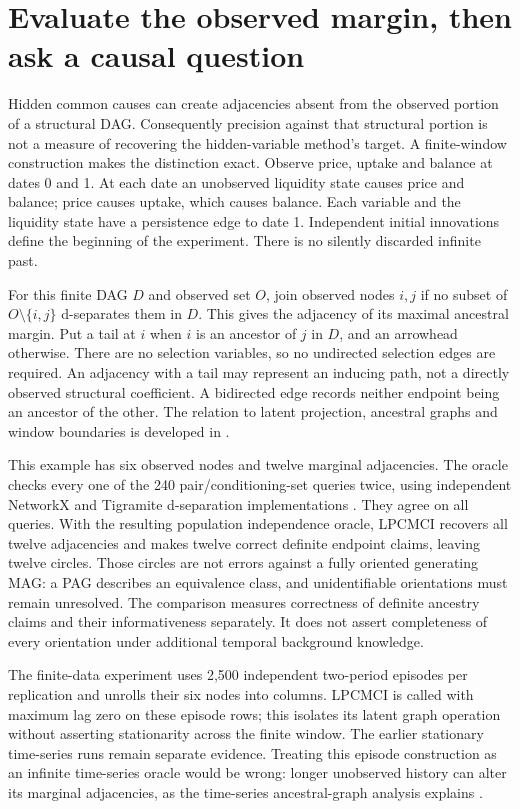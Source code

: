 \section{Evaluate the observed margin, then ask a causal question}
\label{s6:ancestral-target}
Hidden common causes can create adjacencies absent from the observed portion
of a structural DAG. Consequently precision against that structural portion
is not a measure of recovering the hidden-variable method's target. A
finite-window construction makes the distinction exact. Observe price,
uptake and balance at dates 0 and 1. At each date an unobserved liquidity
state causes price and balance; price causes uptake, which causes balance.
Each variable and the liquidity state have a persistence edge to date 1.
Independent initial innovations define the beginning of the experiment.
There is no silently discarded infinite past.

For this finite DAG $D$ and observed set $O$, join observed nodes $i,j$ if
no subset of $O\setminus\{i,j\}$ d-separates them in $D$. This gives the
adjacency of its maximal ancestral margin. Put a tail at $i$ when $i$ is an
ancestor of $j$ in $D$, and an arrowhead otherwise. There are no selection
variables, so no undirected selection edges are required. An adjacency with
a tail may represent an inducing path, not a directly observed structural
coefficient. A bidirected edge records neither endpoint being an ancestor
of the other. The relation to latent projection, ancestral graphs and
window boundaries is developed in \citet{zhang2008,gerhardus2021}.

This example has six observed nodes and twelve marginal adjacencies. The
oracle checks every one of the 240 pair/conditioning-set queries twice,
using independent NetworkX and Tigramite d-separation implementations
\citep{runtime_networkx_dynamic}.
They agree on all queries. With the resulting population independence
oracle, LPCMCI recovers all twelve adjacencies and makes twelve correct
definite endpoint claims, leaving twelve circles. Those circles are not
errors against a fully oriented generating MAG: a PAG describes an
equivalence class, and unidentifiable orientations must remain unresolved.
The comparison measures correctness of definite ancestry claims and their
informativeness separately. It does not assert completeness of every
orientation under additional temporal background knowledge.

The finite-data experiment uses 2,500 independent two-period episodes per
replication and unrolls their six nodes into columns. LPCMCI is called with
maximum lag zero on these episode rows; this isolates its latent graph
operation without asserting stationarity across the finite window. The
earlier stationary time-series runs remain separate evidence. Treating this
episode construction as an infinite time-series oracle would be wrong:
longer unobserved history can alter its marginal adjacencies, as the
time-series ancestral-graph analysis explains \citep{gerhardus2021}.

